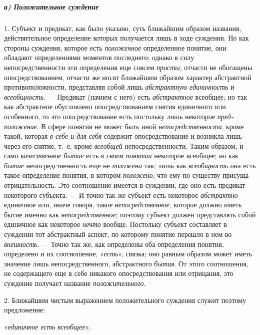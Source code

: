 \documentclass[twoside]{article}
\begin{document}
{{{{\subparagraph[а) Положительное суждение ]{а) Положительное суждение}
1. Субъект и предикат, как было указано, суть ближайшим
образом названия, действительное определение которых получается лишь в ходе
суждения. Но как стороны суждения, которое есть
{\em положенное}
определенное понятие, они обладают определениями моментов
последнего; однако в силу непосредственности эти определения еще совсем
{\em просты}, отчасти не
обогащены опосредствованием, отчасти же носят ближайшим образом характер
абстрактной противоположности, представляя собой лишь
{\em абстрактную единичность}
и {\em всеобщность}. —
Предикат (начнем с него) есть
{\em абстрактное}
всеобщее; но так как абстрактное обусловлено
опосредствованием снятия единичного или особенного, то это опосредствование
есть постольку лишь некоторое
{\em пред-положение}. В
сфере понятия не может быть иной
{\em непосредственности},
кроме такой, которая
{\em в себе и для себя}
содержит опосредствование и возникла лишь через его снятие,
т.~е. кроме {\em всеобщей}
непосредственности. Таким образом, и само
{\em качественное бытие}
есть {\em в своем
понятии} некоторое всеобщее; но как
{\em бытие}
непосредственность еще не
{\em положена} так; лишь
как {\em всеобщность} она
есть такое определение понятия, в котором
{\em положено}, что ему
по существу присуща отрицательность. Это соотношение имеется в суждении,
где оно есть предикат некоторого субъекта. — И точно так же
субъект есть некоторое
{\em абстрактно}{}-единичное
или, иначе говоря, такое
{\em непосредственное},
которое должно иметь бытие именно как
{\em непосредственное};
поэтому субъект должен представлять собой единичное как
некоторое {\em нечто}
вообще. Постольку субъект составляет в суждении тот
абстрактный аспект, по которому понятие перешло в нем во
{\em внешность}. — Точно
так же, как определены оба определения понятия, определено и их
соотношение, «{\em есть}»,
связка; оно равным образом может иметь значение лишь
непосредственного, абстрактного
{\em бытия}. От этого
соотношения, не содержащего еще в себе никакого опосредствования или
отрицания, это суждение получает название
{\em положительного}.

2. Ближайшим чистым выражением положительного суждения служит
поэтому предложение:

«{\em единичное есть всеобщее}».

}}}}
\end{document}
